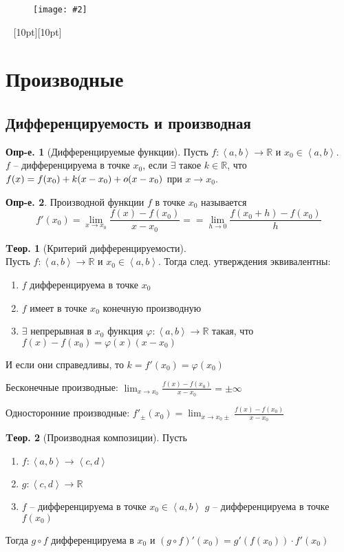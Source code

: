 \documentclass[a4paper,12pt]{article}
\newcommand*{\hm}[1]{#1\nobreak\discretionary{}{\hbox{$\mathsurround=0pt #1$}}{}}
\numberwithin{figure}{section}
\theoremstyle{definition}
\newtheorem{definition}{Опр-е.}[section]
\theoremstyle{definition}
\newtheorem{theorem}{Tеор.}[section]
\def\DS{\displaystyle}
\def\mathR{\mathbb{R}}
\def\on{\!:}
\def\intab{\left<a,b\right>}
\def\vignette {\vspace{48pt} \noindent \hrulefill~ \raisebox{-8pt}[10pt][10pt]{\Huge\ding{102}}~ \hrulefill}
\newcommand\CenterFigure[2]{
	\begin{figure}[H]
		\centering
		\texttt{[image: \#2]}
	\end{figure}
}
\begin{document}
\CenterFigure{\linewidth}{small-o-test-1.png}


\vignette
\section{Производные}


\subsection{Дифференцируемость и производная}


\begin{definition}[Дифференцируемые функции]
	Пусть $f\on\intab\to\mathR$ и $x_0\in\intab$. \\
	$f$ -- дифференцируема в точке $x_0$, если $\exists$ такое $k\in\mathR$,
	что $f(x) = f(x_0) \hm+ k(x-x_0) \hm+ o(x-x_0)$ при $x\to x_0$.
\end{definition}


\begin{definition}
	Производной функции $f$ в точке $x_0$ называется
	\[ f'(x_0) = \lim_{x\to x_0}\frac{f(x)-f(x_0)}{x-x_0}=
			   = \lim_{h\to0}\frac{f(x_0+h)-f(x_0)}h \]
\end{definition}

\bigskip
\begin{theorem}[Критерий дифференцируемости] \ \\
	Пусть $f\on \intab\to\mathR$ и $x_0\in\intab$.
	Тогда след. утверждения эквивалентны:
	\begin{enumerate}
		\item $f$ дифференцируема в точке $x_0$
		\item $f$ имеет в точке $x_0$ конечную производную
		\item $\exists$ непрерывная в $x_0$ функция $\varphi\on\intab\to\mathR$
			  такая, что $f(x)-f(x_0) = \varphi(x)(x-x_0)$
	\end{enumerate}
	И если они справедливы, то $k=f'(x_0)=\varphi(x_0)$
\end{theorem}

\bigskip
Бесконечные производные:
$\DS \lim_{x\to x_0}\frac{f(x)-f(x_0)}{x-x_0} = \pm\infty$

Односторонние производные:
$\DS f'_{\pm}(x_0) = \lim_{x\to x_0\pm}\frac{f(x)-f(x_0)}{x-x_0}$
\bigskip

\begin{theorem}[Производная композиции]
	Пусть
	\begin{enumerate}
		\item $f\on \intab \to \left<c,d\right>$
		\item $g\on \left<c,d\right> \to \mathR$
		\item $f$ -- дифференцируема в точке $x_0 \in\intab$
		$g$ -- дифференцируема в точке $f(x_0)$
	\end{enumerate}
	Тогда $g \circ f$ дифференцируема в $x_0$ и
	$(g \circ f)'(x_0) = g'(f(x_0)) \cdot f'(x_0)$
\end{theorem}
\end{document}
